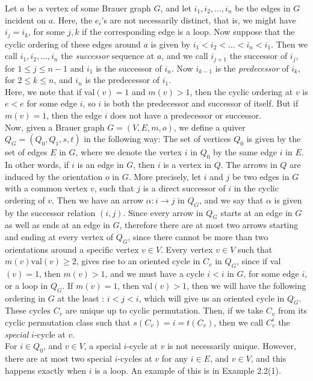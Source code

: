 \documentclass{amsart}
\numberwithin{figure}{section}
\begin{document}
Let $a$ be a vertex of some Brauer graph $G$, and let $i_1,i_2,...,i_n$ be the edges in $G$ incident on $a$. Here, the $e_i$'s are not necessarily distinct, that is, we might have $i_j=i_k$, for some $j,k$ if the corresponding edge is a loop. Now suppose that the cyclic ordering of these edges around $a$ is given by $i_1<i_2<...<i_n<i_1$. Then we call $i_1,i_2,...,i_n$ the \textit{successor} sequence at $a$, and we call $i_{j+1}$ the successor of $i_j$, for $1 \leq j \leq n-1$ and $i_1$ is the successor of $i_n$. Now $i_{k-1}$ is the \textit{predecessor} of $i_k$, for $2\leq k\leq n$, and $i_n$ is the predecessor of $i_1$.\\

Here, we note that if val$(v)=1$ and $m(v)>1$, then the cyclic ordering at $v$ is $e<e$ for some edge $i$, so $i$ is both the predecessor and successor of itself. But if $m(v)=1$, then the edge $i$ does not have a predecessor or successor.\\

Now, given a Brauer graph $G=(V,E,m,o)$, we define a quiver $Q_G=(Q_0,Q_1,s,t)$ in the following way:
The set of vertices $Q_0$ is given by the set of edges $E$ in $G$, where we denote the vertex $i$ in $Q_0$ by the same edge $i$ in $E$. 
In other words, if $i$ is an edge in $G$, then $i$ is a vertex in $Q$. The arrows in $Q$ are induced by the orientation $o$ in $G$.
More precisely, let $i$ and $j$ be two edges in $G$ with a common vertex $v$, such that $j$ is a direct successor of $i$ in the cyclic ordering of $v$.
Then we have an arrow $\alpha:i \to j$ in $Q_G$, and we say that $\alpha$ is given by the successor relation $(i,j)$. 
Since every arrow in $Q_G$ starts at an edge in $G$ as well as ends at an edge in $G$, therefore there are at most two arrows starting and ending at every vertex of $Q_G$, since there cannot be more than two orientations around a specific vertex $v \in V$.
Every vertex $v\in V$ such that $m(v)\mathrm{val}(v) \geq 2$, gives rise to an oriented cycle in $C_v$ in $Q_G$, since if val$(v)=1$, then $m(v)>1$, and we must have a cycle $i<i$ in $G$, for some edge $i$, or a loop in $Q_G$.
If $m(v)=1$, then val$(v)>1$, then we will have the following ordering in $G$ at the least : $i<j<i$, which will give us an oriented cycle in $Q_G$.
These cycles $C_v$ are unique up to cyclic permutation. Then, if we take $C_v$ from its cyclic permutation class such that $s(C_v)=i=t(C_v)$, then we call $C_v^i$ the \textit{special} $i$-cycle at $v$. \\

For $i  \in Q_0$, and $v \in V$, a special $i$-cycle at $v$ is not necessarily unique. However, there are at most two special $i$-cycles at $v$ for any $i \in E$, and $v \in V$, and this happens exactly when $i$ is a loop. An example of this is in Example 2.2(1). 
\end{document}
